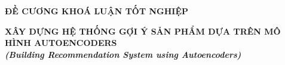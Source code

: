 \documentclass{article}[14pt]
\begin{document}
    \begin{figure}[h]
        \begin{floatrow}
        {%
    
        }
        {%
    
        }
        \end{floatrow}
    \end{figure}
    
    \begin{center}
        
        \textbf{\Large ĐỀ CƯƠNG KHOÁ LUẬN TỐT NGHIỆP} \\ 
    \end{center}
    
    
    \begin{center}
        
        \textbf{\huge  XÂY DỰNG HỆ THỐNG GỢI Ý SẢN PHẨM DỰA TRÊN MÔ HÌNH AUTOENCODERS} \\
        
    \vspace{.5cm}
        \textit{\textbf{\Large (Building Recommendation System using Autoencoders)}}
    \end{center}
    
\end{document}
